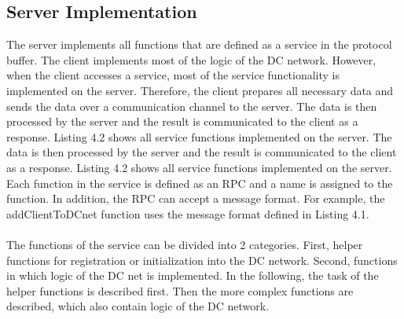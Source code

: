 \subsection{Server Implementation}
The server implements all functions that are defined as a service in the protocol buffer. The client implements most of the logic of the DC network. However, when the client accesses a service, most of the service functionality is implemented on the server. Therefore, the client prepares all necessary data and sends the data over a communication channel to the server. The data is then processed by the server and the result is communicated to the client as a response. Listing 4.2 shows all service functions implemented on the server. The data is then processed by the server and the result is communicated to the client as a response. Listing 4.2 shows all service functions implemented on the server. Each function in the service is defined as an RPC and a name is assigned to the function. In addition, the RPC can accept a message format. For example, the addClientToDCnet function uses the message format defined in Listing 4.1. 
\\

\\ The functions of the service can be divided into 2 categories. First, helper functions for registration or initialization into the DC network. Second, functions in which logic of the DC net is implemented. In the following, the task of the helper functions is described first. Then the more complex functions are described, which also contain logic of the DC network.\\
